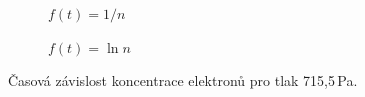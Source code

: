 \documentclass[a4paper,12pt]{article}
\begin{document}
\begin{figure}[h]
	\centering
	\begin{subfigure}[b]{.49\linewidth}
		\centering
		\caption{$f(t) = 1/n$}
	\end{subfigure}
	\begin{subfigure}[b]{.49\linewidth}
		\centering
		\caption{$f(t) = \ln n$}
	\end{subfigure}
	\caption{Časová závislost koncentrace elektronů pro tlak 715,5\,Pa.}
	\label{g:450Pa}
\end{figure}
\end{document}
